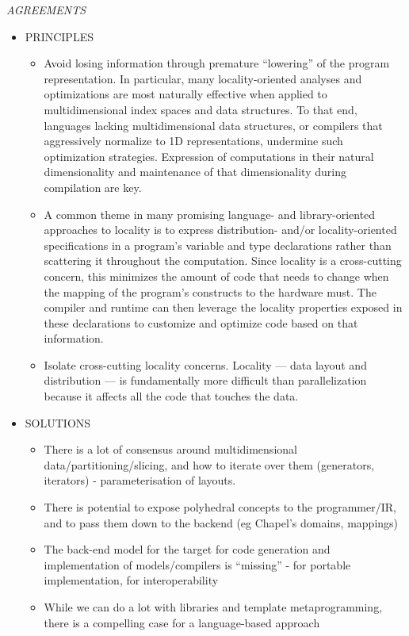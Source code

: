 {\it
AGREEMENTS
\begin{itemize}
\item PRINCIPLES
  \begin{itemize}

  \item Avoid losing information through premature ``lowering'' of the
    program representation.  In particular, many locality-oriented
    analyses and optimizations are most naturally effective when
    applied to multidimensional index spaces and data structures.  To
    that end, languages lacking multidimensional data structures, or
    compilers that aggressively normalize to 1D representations,
    undermine such optimization strategies.  Expression of
    computations in their natural dimensionality and maintenance of
    that dimensionality during compilation are key.

  \item A common theme in many promising language- and
    library-oriented approaches to locality is to express
    distribution- and/or locality-oriented specifications in a
    program's variable and type declarations rather than scattering it
    throughout the computation.  Since locality is a cross-cutting
    concern, this minimizes the amount of code that needs to change
    when the mapping of the program's constructs to the hardware must.
    The compiler and runtime can then leverage the locality properties
    exposed in these declarations to customize and optimize code based
    on that information.

  \item Isolate cross-cutting locality concerns.  Locality --- data layout and distribution --- is fundamentally more difficult than parallelization because it affects all the code that touches the data.   
  \end{itemize}
\item SOLUTIONS
  \begin{itemize}
  \item There is a lot of consensus around multidimensional data/partitioning/slicing, and how to iterate over them (generators, iterators) - parameterisation of layouts.
  \item There is potential to expose polyhedral concepts to the programmer/IR, and to pass them down to the backend (eg Chapel’s domains, mappings)
  \item The back-end model for the target for code generation and implementation of models/compilers is “missing” - for portable implementation, for interoperability
  \item While we can do a lot with libraries and template metaprogramming, there is a compelling case for a language-based approach
  \end{itemize}
\end{itemize}

}
